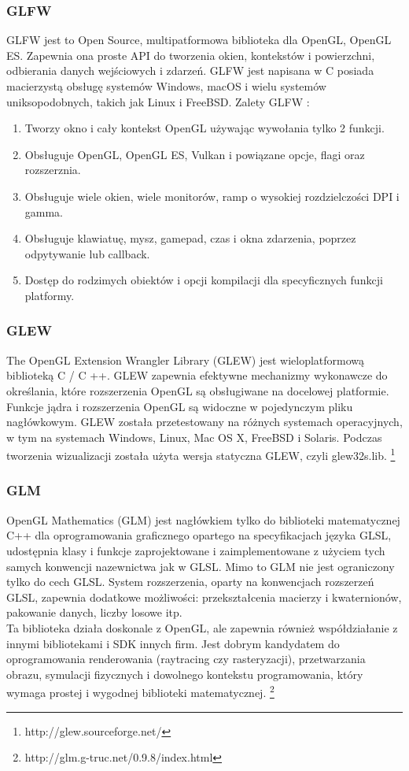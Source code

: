\subsubsection{GLFW} 
GLFW jest to Open Source, multipatformowa biblioteka dla OpenGL, OpenGL ES. Zapewnia ona proste API do tworzenia okien, kontekstów i powierzchni, odbierania danych wejściowych i zdarzeń. GLFW jest napisana w C posiada macierzystą obsługę systemów Windows, macOS i wielu systemów uniksopodobnych, takich jak Linux i FreeBSD. 
Zalety GLFW :
\begin{enumerate}
\item Tworzy okno i cały kontekst OpenGL używając wywołania tylko 2 funkcji.
\item Obsługuje OpenGL, OpenGL ES, Vulkan i powiązane opcje, flagi oraz rozszerznia.
\item Obsługuje wiele okien, wiele monitorów, ramp o wysokiej rozdzielczości DPI i gamma.
\item Obsługuje klawiatuę, mysz, gamepad, czas i okna zdarzenia, poprzez odpytywanie lub callback.
\item Dostęp do rodzimych obiektów i opcji kompilacji dla specyficznych funkcji platformy.
\end{enumerate} 

\subsubsection{GLEW}
The OpenGL Extension Wrangler Library (GLEW) jest wieloplatformową biblioteką C / C ++. GLEW zapewnia efektywne mechanizmy wykonawcze do określania, które rozszerzenia OpenGL są obsługiwane na docelowej platformie. Funkcje jądra i rozszerzenia OpenGL są widoczne w pojedynczym pliku nagłówkowym. GLEW została przetestowany na różnych systemach operacyjnych, w tym na systemach Windows, Linux, Mac OS X, FreeBSD i Solaris.
Podczas tworzenia wizualizacji została użyta wersja statyczna GLEW, czyli glew32s.lib. \footnote{http://glew.sourceforge.net/}

\subsubsection{GLM}
OpenGL Mathematics (GLM) jest nagłówkiem tylko do biblioteki matematycznej C++ dla oprogramowania graficznego opartego na specyfikacjach języka GLSL, udostępnia klasy i funkcje zaprojektowane i zaimplementowane z użyciem tych samych konwencji nazewnictwa jak w GLSL. Mimo to GLM nie jest ograniczony tylko do cech GLSL. System rozszerzenia, oparty na konwencjach rozszerzeń GLSL, zapewnia dodatkowe możliwości: przekształcenia macierzy i kwaternionów, pakowanie danych, liczby losowe itp. \\
Ta biblioteka działa doskonale z OpenGL, ale zapewnia również współdziałanie z innymi bibliotekami i SDK innych firm. Jest dobrym kandydatem do oprogramowania renderowania (raytracing czy rasteryzacji), przetwarzania obrazu, symulacji fizycznych i dowolnego kontekstu programowania, który wymaga prostej i wygodnej biblioteki matematycznej. 
\footnote{http://glm.g-truc.net/0.9.8/index.html}




